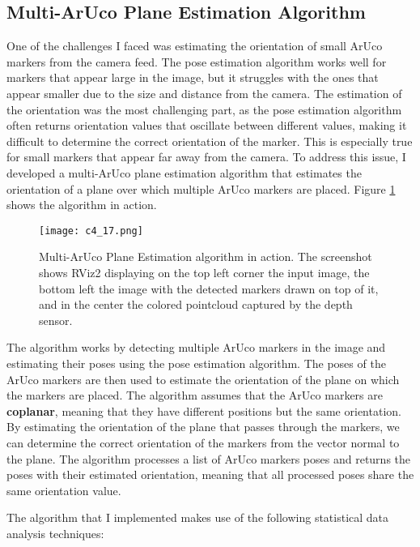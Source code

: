 \subsection{Multi-ArUco Plane Estimation Algorithm}

One of the challenges I faced was estimating the orientation of small ArUco markers from the camera feed.
The pose estimation algorithm works well for markers that appear large in the image, but it struggles with
the ones that appear smaller due to the size and distance from the camera. The estimation of the orientation
was the most challenging part, as the pose estimation algorithm often returns orientation values that
oscillate between different values, making it difficult to determine the correct orientation of the marker.
This is especially true for small markers that appear far away from the camera. To address this issue,
I developed a multi-ArUco plane estimation algorithm that estimates the orientation of a plane over which
multiple ArUco markers are placed. Figure \ref{fig:multi_aruco} shows the algorithm in action.

\begin{figure}[t]
    \centering
    \texttt{[image: c4\_17.png]}
    \caption{Multi-ArUco Plane Estimation algorithm in action. The screenshot shows RViz2 displaying
    on the top left corner the input image, the bottom left the image with the detected markers drawn on top of it,
    and in the center the colored pointcloud captured by the depth sensor.}
    \label{fig:multi_aruco}
\end{figure}

The algorithm works by detecting multiple ArUco markers in the image and estimating their poses using the pose
estimation algorithm. The poses of the ArUco markers are then used to estimate the orientation of the plane
on which the markers are placed. The algorithm assumes that the ArUco markers are \textbf{coplanar}, meaning that 
they have different positions but the same orientation. By estimating the orientation of the plane that passes
through the markers, we can determine the correct orientation of the markers from the vector normal
to the plane. The algorithm processes a list of ArUco markers poses and returns the poses with their
estimated orientation, meaning that all processed poses share the same orientation value.

The algorithm that I implemented makes use of the following statistical data analysis techniques:

